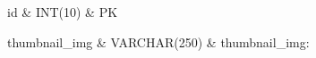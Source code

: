 id & INT(10) & PK \tabularnewline\hline 





















	thumbnail\_img & VARCHAR(250) & thumbnail\_img: \tabularnewline\hline 
